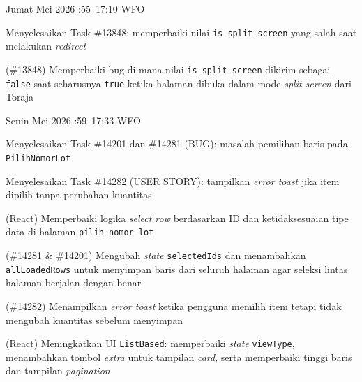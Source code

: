 \begin{logtable}
    {
        Jumat  Mei 2026 :55--17:10 \linebreak %
        WFO
    }{
        \begin{loglist}
            \item Menyelesaikan Task \#13848: memperbaiki nilai \texttt{is\_split\_screen} yang
            salah saat melakukan \textit{redirect}
        \end{loglist}
    }{
        \begin{logwork}
            \item (\#13848) Memperbaiki bug di mana nilai \texttt{is\_split\_screen} dikirim sebagai \texttt{false} saat seharusnya \texttt{true} ketika halaman dibuka dalam mode \textit{split screen} dari Toraja
        \end{logwork}
    }


    {
        Senin  Mei 2026 :59--17:33 \linebreak %
        WFO
    }{
        \begin{loglist}
            \item Menyelesaikan Task \#14201 dan \#14281 (BUG): masalah pemilihan baris pada
            \texttt{PilihNomorLot}
            \item Menyelesaikan Task \#14282 (USER STORY): tampilkan \textit{error toast} jika
            item dipilih tanpa perubahan kuantitas
        \end{loglist}
    }{
        \begin{logwork}
            \item (React) Memperbaiki logika \textit{select row} berdasarkan ID dan ketidaksesuaian tipe data di halaman \texttt{pilih-nomor-lot}
            \item (\#14281 \& \#14201) Mengubah \textit{state} \texttt{selectedIds} dan menambahkan \texttt{allLoadedRows} untuk menyimpan baris dari seluruh halaman agar seleksi lintas halaman berjalan dengan benar
            \item (\#14282) Menampilkan \textit{error toast} ketika pengguna memilih item tetapi tidak mengubah kuantitas sebelum menyimpan
            \item (React) Meningkatkan UI \texttt{ListBased}: memperbaiki \textit{state} \texttt{viewType}, menambahkan tombol \textit{extra} untuk tampilan \textit{card}, serta memperbaiki tinggi baris dan tampilan \textit{pagination}
        \end{logwork}
    }


\end{logtable}

